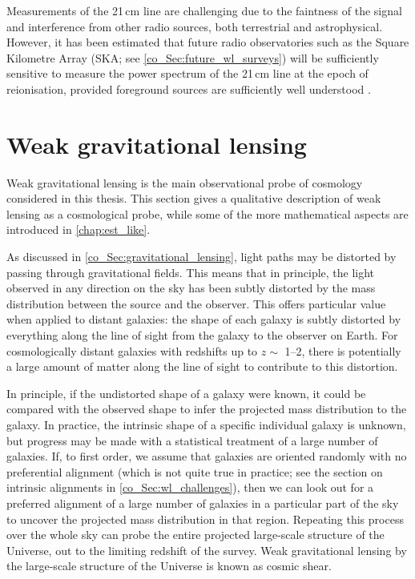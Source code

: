 Measurements of the 21\,cm line are challenging due to the faintness of the signal and interference from other radio sources, both terrestrial and astrophysical. However, it has been estimated that future radio observatories such as the Square Kilometre Array (SKA; see \autoref{co_Sec:future_wl_surveys}) will be sufficiently sensitive to measure the power spectrum of the 21\,cm line at the epoch of reionisation, provided foreground sources are sufficiently well understood \citep{Pober2014}.

\section{Weak gravitational lensing}
\label{co_Sec:weak_lensing}

Weak gravitational lensing is the main observational probe of cosmology considered in this thesis. This section gives a qualitative description of weak lensing as a cosmological probe, while some of the more mathematical aspects are introduced in \autoref{chap:est_like}.

As discussed in \autoref{co_Sec:gravitational_lensing}, light paths may be distorted by passing through gravitational fields. This means that in principle, the light observed in any direction on the sky has been subtly distorted by the mass distribution between the source and the observer. This offers particular value when applied to distant galaxies: the shape of each galaxy is subtly distorted by everything along the line of sight from the galaxy to the observer on Earth. For cosmologically distant galaxies with redshifts up to $z \sim$ 1--2, there is potentially a large amount of matter along the line of sight to contribute to this distortion.

In principle, if the undistorted shape of a galaxy were known, it could be compared with the observed shape to infer the projected mass distribution to the galaxy. In practice, the intrinsic shape of a specific individual galaxy is unknown, but progress may be made with a statistical treatment of a large number of galaxies. If, to first order, we assume that galaxies are oriented randomly with no preferential alignment (which is not quite true in practice; see the section on intrinsic alignments in \autoref{co_Sec:wl_challenges}), then we can look out for a preferred alignment of a large number of galaxies in a particular part of the sky to uncover the projected mass distribution in that region. Repeating this process over the whole sky can probe the entire projected large-scale structure of the Universe, out to the limiting redshift of the survey. Weak gravitational lensing by the large-scale structure of the Universe is known as cosmic shear.

